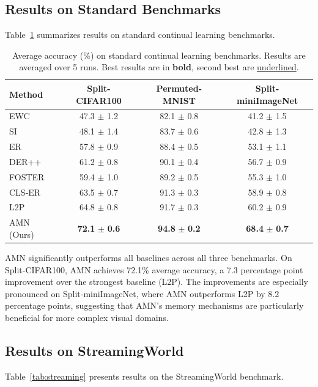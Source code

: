 \documentclass[11pt]{article}
\begin{document}
\subsection{Results on Standard Benchmarks}

Table~\ref{tab:standard} summarizes results on standard continual learning benchmarks.

\begin{table}[h]
\centering
\caption{Average accuracy (\%) on standard continual learning benchmarks. Results are averaged over 5 runs. Best results are in \textbf{bold}, second best are \underline{underlined}.}
\label{tab:standard}
\begin{tabular}{@{}lccc@{}}
\toprule
Method & Split-CIFAR100 & Permuted-MNIST & Split-miniImageNet \\
\midrule
EWC & 47.3 $\pm$ 1.2 & 82.1 $\pm$ 0.8 & 41.2 $\pm$ 1.5 \\
SI & 48.1 $\pm$ 1.4 & 83.7 $\pm$ 0.6 & 42.8 $\pm$ 1.3 \\
ER & 57.8 $\pm$ 0.9 & 88.4 $\pm$ 0.5 & 53.1 $\pm$ 1.1 \\
DER++ & 61.2 $\pm$ 0.8 & 90.1 $\pm$ 0.4 & 56.7 $\pm$ 0.9 \\
FOSTER & 59.4 $\pm$ 1.0 & 89.2 $\pm$ 0.5 & 55.3 $\pm$ 1.0 \\
CLS-ER & 63.5 $\pm$ 0.7 & 91.3 $\pm$ 0.3 & 58.9 $\pm$ 0.8 \\
L2P & 64.8 $\pm$ 0.8 & 91.7 $\pm$ 0.3 & 60.2 $\pm$ 0.9 \\
\midrule
AMN (Ours) & \textbf{72.1} $\pm$ \textbf{0.6} & \textbf{94.8} $\pm$ \textbf{0.2} & \textbf{68.4} $\pm$ \textbf{0.7} \\
\bottomrule
\end{tabular}
\end{table}

AMN significantly outperforms all baselines across all three benchmarks. On Split-CIFAR100, AMN achieves 72.1\% average accuracy, a 7.3 percentage point improvement over the strongest baseline (L2P). The improvements are especially pronounced on Split-miniImageNet, where AMN outperforms L2P by 8.2 percentage points, suggesting that AMN's memory mechanisms are particularly beneficial for more complex visual domains.

\subsection{Results on StreamingWorld}

Table~\ref{tab:streaming} presents results on the StreamingWorld benchmark.
\end{document}
